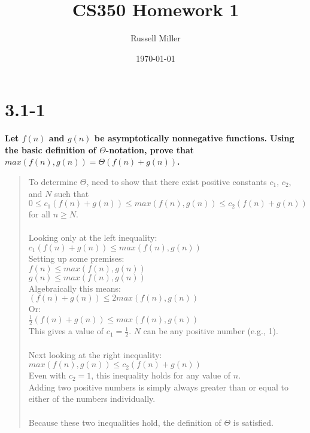 \documentclass{article}
\title{CS350 Homework 1}
\author{Russell Miller}
\date{\today}
\begin{document}
\maketitle

\section*{3.1-1}
\textbf{Let $f(n)$ and $g(n)$ be asymptotically nonnegative functions. Using 
the basic definition of $\Theta$-notation, prove that $max(f(n),g(n)) = 
\Theta(f(n)+g(n))$.\\}

\begin{quote}
\textsf{To determine $\Theta$, need to show that there exist positive constants $c_{1}$, 
$c_{2}$, and $N$ such that\\ $0 \leq c_{1}(f(n)+g(n)) \leq max(f(n),g(n))
 \leq c_{2}(f(n)+g(n))$ for all $n \geq N$.\\
\\
Looking only at the left inequality:\\
$c_{1}(f(n)+g(n)) \leq max(f(n),g(n))$\\
Setting up some premises:\\
$f(n) \leq max(f(n),g(n))$\\
$g(n) \leq max(f(n),g(n))$\\
Algebraically this means:\\
$(f(n)+g(n)) \leq 2max(f(n),g(n))$\\
Or:\\
$\frac{1}{2}(f(n)+g(n)) \leq max(f(n),g(n))$\\
This gives a value of $c_{1} = \frac{1}{2}$. $N$ can be any positive number (e.g., 1).\\
\\
Next looking at the right inequality:\\
$max(f(n),g(n)) \leq c_{2}(f(n)+g(n))$\\
Even with $c_{2} = 1$, this inequality holds for any value of $n$.\\
Adding two positive numbers is simply always greater than or equal to either of the numbers individually.\\
\\
Because these two inequalities hold, the definition of $\Theta$ is satisfied.\\}
\end{quote}

\pagebreak
\end{document}
